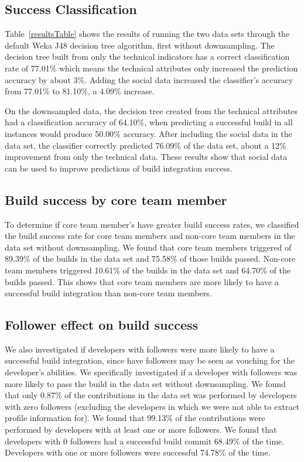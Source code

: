 \documentclass[10pt, conference]{IEEEtran}
\begin{document}
\subsection{Success Classification}
 
 


Table~\ref{resultsTable} shows the results of running the two data sets through the
default Weka J48 decision tree algorithm, first without downsampling. The 
decision tree built from
only the technical indicators has a correct classification rate of 77.01\% which
means the technical attributes only increased the prediction accuracy by about 3\%.
Adding the social data increased the classifier's accuracy from 77.01\% to
81.10\%, a 4.09\% increase.

On the downsampled data, the decision tree created from the technical attributes
had a classification accuracy of 64.10\%, when predicting a successful build in
all instances would produce 50.00\% accuracy.  After including the social data
in the data set, the classifier correctly predicted 76.09\% of the data set,
about a 12\% improvement from only the technical data.  These results show that
social data can be used to improve predictions of build integration success.

\subsection{Build success by core team member}

To determine if core team member's have greater build success rates,
we classified the build success rate for
core team members and non-core team members in the data set without 
downsampling.  We found that core team members
triggered of 89.39\% of the builds in the data set and 75.58\% of those builds
passed.  Non-core team members triggered 10.61\% of the builds in the data set
and 64.70\% of the builds passed.  This shows that core team members are more
likely to have a successful build integration than non-core team members.



\subsection{Follower effect on build success}

We also investigated if developers with followers were more likely to have a
successful build integration, since have followers may be seen as vouching for
the developer's abilities.  We specifically investigated if a developer with 
followers was more likely to pass the build in the data set without 
downsampling.  We found that only 0.87\% of the
contributions in the data set was performed by developers with zero 
followers (excluding the developers in which we were not able to extract profile
information for). We found that 99.13\% of the contributions were performed by
developers with at least one or more followers.
We found that developers with 0 followers had a successful build commit 68.49\%
of the time.  Developers with one or more followers were successful 74.78\% of
the time.
\end{document}

